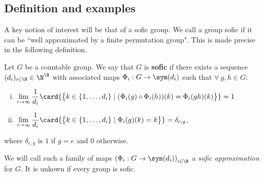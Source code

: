 
\subsection{Definition and examples}

    A key notion of interest will be that of a sofic group. We call a group sofic if it can be ``well approximated by a finite permutation group". This is made precise in the following definition.

    \begin{definition}\label{def:Sofic}
	    Let $G$ be a countable group. We say that $G$ is \textbf{sofic} if there exists a sequence $(d_i)_{i \in \N} \in \N ^{\N}$ with associated maps $\Phi_i : G \to \sym(d_i)$ such that $\forall\ g, h \in G$:
        \begin{enumerate}[(i)]
            \item $\displaystyle \lim_{i\to \infty} \frac{1}{d_i} \card{\big\{k \in \{1, \dots, d_i\} \mid (\Phi_i(g) \circ \Phi_i(h))(k) = \Phi_i(gh) (k) \big\}} = 1$
            \item $\displaystyle \lim_{i\to \infty} \frac{1}{d_i}  \card{\big\{k \in \{1, \dots, d_i\} \mid \Phi_i(g)(k) = k \big\}} = \delta_{e,g}$,
        \end{enumerate}
        where $\delta_{e,g}$ is $1$ if $g = e$ and $0$ otherwise.
    \end{definition}

    We will call such a family of maps $\left(\Phi_i : G \to \sym(d_i) \right)_{i \in \N}$ a \emph{sofic approximation} for $G$. It is unkown if every group is sofic.



